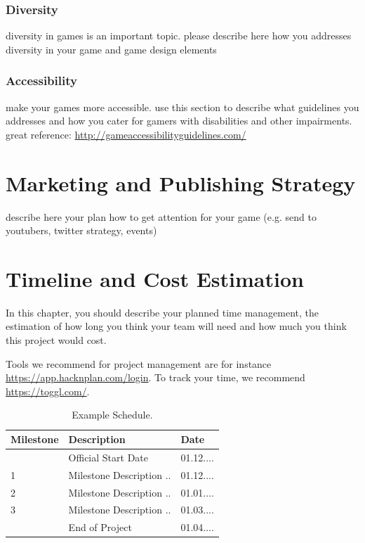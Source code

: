 \documentclass[a4paper]{scrreprt}
\begin{document}
\subsection{Diversity}
diversity in games is an important topic. please describe here how you addresses diversity in your game and game design elements 
\subsection{Accessibility}
make your games more accessible. use this section to describe what guidelines you addresses and how you cater for  gamers with disabilities and other impairments. great reference: \url{http://gameaccessibilityguidelines.com/}



\chapter{Marketing and Publishing Strategy}

describe here your plan how to get attention for your game (e.g. send to youtubers, twitter strategy, events) 





\chapter{Timeline and Cost Estimation}

In this chapter, you should describe your planned time management, the estimation of how long you think your team will need and how much you think this project would cost. 

Tools we recommend for project management are for instance \url{https://app.hacknplan.com/login}. To track your time, we recommend \url{https://toggl.com/}.  

\begin{table}[h]
\centering
\begin{tabular}{|l|l|l|}
\hline
Milestone & Description & Date \\\hline
& Official Start Date & 01.12.... \\
1 & Milestone Description ..  & 01.12.... \\
2 & Milestone Description ..  & 01.01.... \\
3 & Milestone Description ..  & 01.03.... \\
& End of Project & 01.04.... \\
\hline
\end{tabular}
\caption{\label{tab:schedule}Example Schedule.}
\end{table}
\end{document}
